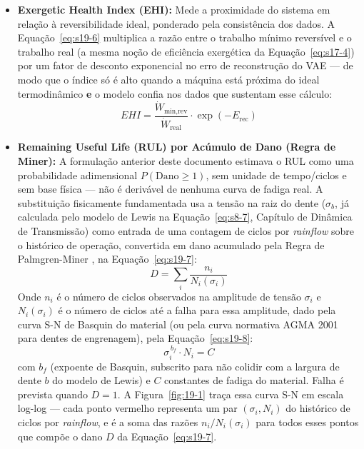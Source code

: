 \documentclass[12pt,a4paper]{article}
\numberwithin{equation}{section}
\numberwithin{table}{section}
\numberwithin{figure}{section}
\begin{document}
\begin{itemize}
	\item \textbf{Exergetic Health Index (EHI):} Mede a proximidade do sistema em relação à reversibilidade ideal, ponderado pela consistência dos dados. A Equação~\eqref{eq:s19-6} multiplica a razão entre o trabalho mínimo reversível e o trabalho real (a mesma noção de eficiência exergética da Equação~\eqref{eq:s17-4}) por um fator de desconto exponencial no erro de reconstrução do VAE — de modo que o índice só é alto quando a máquina está próxima do ideal termodinâmico \textbf{e} o modelo confia nos dados que sustentam esse cálculo:
	\begin{equation}\label{eq:s19-6}
 EHI = \frac{\dot{W}_{\text{min,rev}}}{\dot{W}_{\text{real}}} \cdotp \exp(-E_{\text{rec}})
\end{equation}
	
	\item \textbf{Remaining Useful Life (RUL) por Acúmulo de Dano (Regra de Miner):} A formulação anterior deste documento estimava o RUL como uma probabilidade adimensional $P(\text{Dano} \ge 1)$, sem unidade de tempo/ciclos e sem base física — não é derivável de nenhuma curva de fadiga real. A substituição fisicamente fundamentada usa a tensão na raiz do dente ($\sigma_b$, já calculada pelo modelo de Lewis na Equação~\eqref{eq:s8-7}, Capítulo de Dinâmica de Transmissão) como entrada de uma contagem de ciclos por \textit{rainflow} sobre o histórico de operação, convertida em dano acumulado pela Regra de Palmgren-Miner \cite{palmgren, miner}, na Equação~\eqref{eq:s19-7}:
	\begin{equation}\label{eq:s19-7}
 D = \sum_{i} \frac{n_i}{N_i(\sigma_i)} 
\end{equation}
	Onde $n_i$ é o número de ciclos observados na amplitude de tensão $\sigma_i$ e $N_i(\sigma_i)$ é o número de ciclos até a falha para essa amplitude, dado pela curva S-N de Basquin \cite{basquin} do material (ou pela curva normativa AGMA 2001 \cite{agma2001} para dentes de engrenagem), pela Equação~\eqref{eq:s19-8}:
	\begin{equation}\label{eq:s19-8}
 \sigma_i^{\,b_f} \cdot N_i = C 
\end{equation}
	com $b_f$ (expoente de Basquin, subscrito para não colidir com a largura de dente $b$ do modelo de Lewis) e $C$ constantes de fadiga do material. Falha é prevista quando $D = 1$. A Figura~\ref{fig:19-1} traça essa curva S-N em escala log-log — cada ponto vermelho representa um par $(\sigma_i, N_i)$ do histórico de ciclos por \textit{rainflow}, e é a soma das razões $n_i/N_i(\sigma_i)$ para todos esses pontos que compõe o dano $D$ da Equação~\eqref{eq:s19-7}.


\end{itemize}
\end{document}

